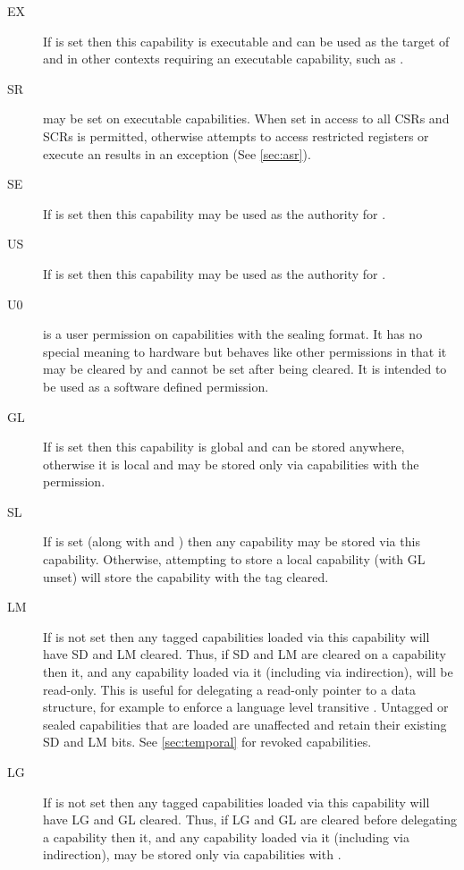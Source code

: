 \begin{description}
\item[EX] If \cappermX is set then this capability is executable and can be used as the target of  and in other contexts requiring an executable capability, such as .
\item[SR] \cappermASR{} may be set on executable capabilities.
When set in \PCC{} access to all CSRs and SCRs is permitted, otherwise attempts to access restricted registers or execute an  results in an exception (See \cref{sec:asr}).
\item[SE] If \cappermSeal is set then this capability may be used as the authority for .
\item[US] If \cappermUnseal is set then this capability may be used as the authority for .
\item[U0] \cappermUZ is a user permission on capabilities with the sealing format.
It has no special meaning to hardware but behaves like other permissions in that it may be cleared by  and cannot be set after being cleared.
It is intended to be used as a software defined permission.
\item[GL] If \cappermG is set then this capability is global and can be stored anywhere, otherwise it is local and may be stored only via capabilities with the \cappermSLC permission.
\item[SL] If \cappermSLC is set (along with \cappermS and \cappermMC) then any capability may be stored via this capability.
Otherwise, attempting to store a local capability (with GL unset) will store the capability with the tag cleared.
\item[LM] If \cappermLM is not set then any tagged capabilities loaded via this capability will have SD and LM cleared.
Thus, if SD and LM are cleared on a capability then it, and any capability loaded via it (including via indirection), will be read-only.
This is useful for delegating a read-only pointer to a data structure, for example to enforce a language level transitive .
Untagged or sealed capabilities that are loaded are unaffected and retain their existing SD and LM bits.
See \cref{sec:temporal} for revoked capabilities.
\item[LG] If \cappermILG is not set then any tagged capabilities loaded via this capability will have LG and GL cleared.
Thus, if LG and GL are cleared before delegating a capability then it, and any capability loaded via it (including via indirection), may be stored only via capabilities with \cappermSLC.

\end{description}
